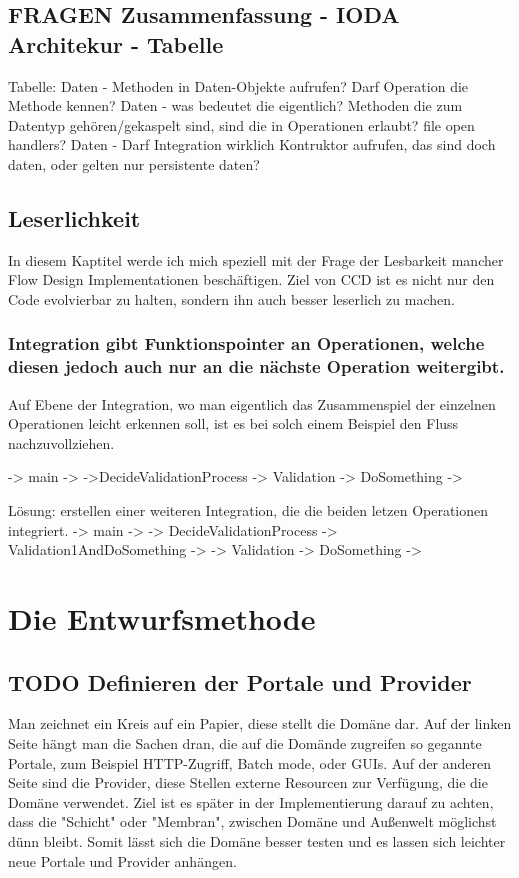 \documentclass[11pt]{article}
\begin{document}
\subsection{{\bfseries\sffamily FRAGEN} Zusammenfassung - IODA Architekur -  Tabelle}
\label{sec:orgheadline61}

Tabelle:
Daten - Methoden in Daten-Objekte aufrufen? Darf Operation die Methode kennen?
Daten - was bedeutet die eigentlich? Methoden die zum Datentyp
gehören/gekaspelt sind, sind die in Operationen erlaubt? file open handlers?
Daten - Darf Integration wirklich Kontruktor aufrufen, das sind doch daten, oder gelten nur persistente daten?



\subsection{Leserlichkeit}
\label{sec:orgheadline63}
In diesem Kaptitel werde ich mich speziell mit der Frage der Lesbarkeit mancher Flow Design Implementationen beschäftigen.
Ziel von CCD ist es nicht nur den Code evolvierbar zu halten, sondern ihn auch besser leserlich zu machen.

\subsubsection{Integration gibt Funktionspointer an Operationen, welche diesen jedoch auch nur an die nächste Operation weitergibt.}
\label{sec:orgheadline62}
Auf Ebene der Integration, wo man eigentlich das Zusammenspiel der einzelnen Operationen leicht erkennen soll, ist es bei solch einem Beispiel den 
Fluss nachzuvollziehen.

-> main ->
->DecideValidationProcess -> Validation -> DoSomething ->

Lösung: erstellen einer weiteren Integration, die die beiden letzen Operationen integriert.
-> main ->
-> DecideValidationProcess -> Validation1AndDoSomething ->
                          -> Validation -> DoSomething ->


\section{Die Entwurfsmethode}
\label{sec:orgheadline70}

\subsection{{\bfseries\sffamily TODO} Definieren der Portale und Provider}
\label{sec:orgheadline65}
    Man zeichnet ein Kreis auf ein Papier, diese stellt die Domäne dar.
    Auf der linken Seite hängt man die Sachen dran, die auf die Domände zugreifen so gegannte Portale, zum Beispiel HTTP-Zugriff,
    Batch mode, oder GUIs.
    Auf der anderen Seite sind die Provider, diese Stellen externe Resourcen zur Verfügung, die die Domäne verwendet.
    Ziel ist es später in der Implementierung darauf zu achten, dass die "Schicht" oder "Membran", zwischen Domäne und Außenwelt möglichst
dünn bleibt. Somit lässt sich die Domäne besser testen und es lassen sich leichter neue Portale und Provider anhängen.
\end{document}
